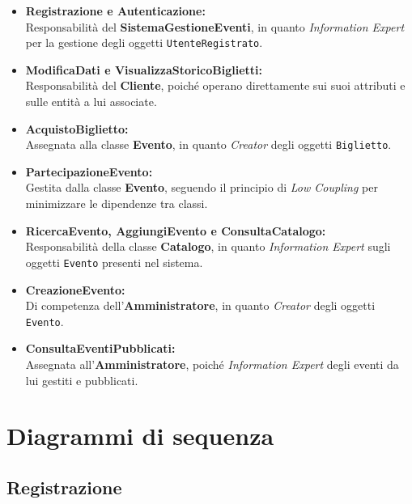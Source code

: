 \vspace{-0.5em} %
\begin{itemize}\setlength\itemsep{0.4em} %
    \item \textbf{Registrazione e Autenticazione:} \\
    Responsabilità del \textbf{SistemaGestioneEventi}, in quanto \emph{Information Expert} per la gestione degli oggetti \texttt{UtenteRegistrato}.
    
    \item \textbf{ModificaDati e VisualizzaStoricoBiglietti:} \\
    Responsabilità del \textbf{Cliente}, poiché operano direttamente sui suoi attributi e sulle entità a lui associate.
    
    \item \textbf{AcquistoBiglietto:} \\
    Assegnata alla classe \textbf{Evento}, in quanto \emph{Creator} degli oggetti \texttt{Biglietto}.
    
    \item \textbf{PartecipazioneEvento:} \\
    Gestita dalla classe \textbf{Evento}, seguendo il principio di \emph{Low Coupling} per minimizzare le dipendenze tra classi.
    
    \item \textbf{RicercaEvento, AggiungiEvento e ConsultaCatalogo:} \\
    Responsabilità della classe \textbf{Catalogo}, in quanto \emph{Information Expert} sugli oggetti \texttt{Evento} presenti nel sistema.
    
    \item \textbf{CreazioneEvento:} \\
    Di competenza dell'\textbf{Amministratore}, in quanto \emph{Creator} degli oggetti \texttt{Evento}.
    
    \item \textbf{ConsultaEventiPubblicati:} \\
    Assegnata all'\textbf{Amministratore}, poiché \emph{Information Expert} degli eventi da lui gestiti e pubblicati.
\end{itemize}


\section{Diagrammi di sequenza}
\subsection{Registrazione}

